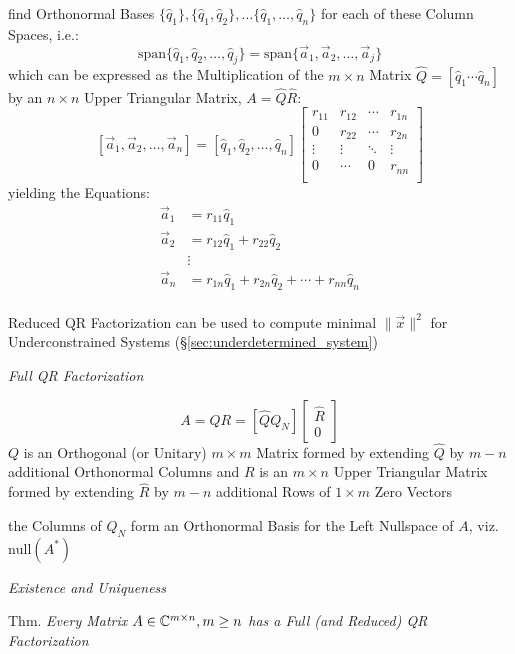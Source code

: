 find Orthonormal Bases $\{ \hat{q}_1 \}, \{ \hat{q}_1, \hat{q}_2 \}, \ldots \{
\hat{q}_1, \ldots, \hat{q}_n\}$ for each of these Column Spaces, i.e.:
\[
  \mathrm{span} \{ \hat{q}_1, \hat{q}_2, \ldots, \hat{q}_j \} =
  \mathrm{span} \{ \vec{a}_1, \vec{a}_2, \ldots, \vec{a}_j \}
\]
which can be expressed as the Multiplication of the $m \times n$ Matrix
$\hat{Q} = [ \hat{q}_1 \cdots \hat{q}_n ]$ by an $n \times n$ Upper Triangular
Matrix, $A = \hat{Q}\hat{R}$:
\[
  [\vec{a}_1, \vec{a}_2, \ldots, \vec{a}_n] =
  [\hat{q}_1, \hat{q}_2, \ldots, \hat{q}_n]
  \begin{bmatrix}
    r_{11} & r_{12} & \cdots & r_{1n} \\
    0      & r_{22} & \cdots & r_{2n} \\
    \vdots & \vdots & \ddots & \vdots \\
    0      & \cdots & 0      & r_{nn} \\
  \end{bmatrix}
\]
yielding the Equations:
\begin{align*}
  \vec{a}_1 & = r_{11}\hat{q}_1 \\
  \vec{a}_2 & = r_{12}\hat{q}_1 + r_{22}\hat{q}_2 \\
            & \vdots \\
  \vec{a}_n & = r_{1n}\hat{q}_1 + r_{2n}\hat{q}_2 + \cdots + r_{nn}\hat{q}_n \\
\end{align*}

Reduced QR Factorization can be used to compute minimal $\|\vec{x}\|^2$ for
Underconstrained Systems (\S\ref{sec:underdetermined_system})


\emph{Full QR Factorization}

\[
  A = QR = [\hat{Q}Q_N]\begin{bmatrix} \hat{R} \\ 0 \end{bmatrix}
\]
$Q$ is an Orthogonal (or Unitary) $m \times m$ Matrix formed by extending
$\hat{Q}$ by $m - n$ additional Orthonormal Columns and $R$ is an $m \times n$
Upper Triangular Matrix formed by extending $\hat{R}$ by $m - n$ additional
Rows of $1 \times m$ Zero Vectors

the Columns of $Q_N$ form an Orthonormal Basis for the Left Nullspace of $A$,
viz. $\mathrm{null}(A^*)$


\emph{Existence and Uniqueness}

Thm. \emph{Every Matrix $A \in \mathbb{C}^{m \times n}, m \geq n$ has a Full (and
  Reduced) QR Factorization}

